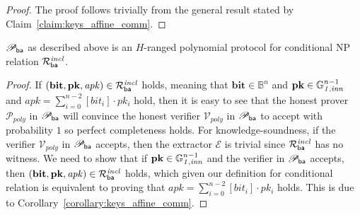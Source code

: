 \begin{proof}The proof follows trivially from the general result stated by Claim~\ref{claim:keys_affine_comm}. 
\end{proof}
\vspace{-0.1in}

\begin{lemma} 
\label{le:ba}
$\mathscr{P}_{\mathsf{ba}}$ as described above is an $H$-ranged polynomial 
protocol for conditional NP relation $\mathcal{R}^{\mathit{incl}}_{\mathsf{ba}}$.
\end{lemma}
\vspace{-0.15in}

\begin{proof}
If $(\mathbf{bit},\mathbf{pk}, \mathit{apk}) \in \mathcal{R}^{\mathit{incl}}_{\mathsf{ba}}$ holds, 
meaning that $\mathbf{bit} \in \mathbb{B}^n$ and $\mathbf{pk} \in \mathbb{G}_{\mathit{1,inn}}^{n-1}$ and $\mathit{apk} = \sum_{i=0}^{n-2} [\mathit{bit_i}] \cdot \mathit{pk_i}$ hold, 
then it is easy to see that the honest prover $\mathcal{P}_{poly}$ in $\mathscr{P}_{\mathsf{ba}}$ will convince the honest verifier $\mathcal{V}_{poly}$ in 
$\mathscr{P}_{\mathsf{ba}}$ to accept with probability $1$ so perfect completeness holds. 
For knowledge-soundness, if the verifier $\mathcal{V}_{poly}$ in $\mathscr{P}_{\mathsf{ba}}$ accepts, 
then the extractor $\mathcal{E}$ is trivial since $\mathcal{R}^{\mathit{incl}}_{\mathsf{ba}}$ has no witness.  
We need to show that if $\mathbf{pk} \in \mathbb{G}_{\mathit{1,inn}}^{n-1}$ and the verifier in $\mathscr{P}_{\mathsf{ba}}$ accepts, 
then $(\mathbf{bit},\mathbf{pk}, \mathit{apk}) \in \mathcal{R}^{\mathit{incl}}_{\mathsf{ba}}$ holds, which given our definition for conditional relation is 
equivalent to proving that $\mathit{apk} = \sum_{i=0}^{n-2} [\mathit{bit_i}] \cdot \mathit{pk_i}$ holds. This is due to 
Corollary~\ref{corollary:keys_affine_comm}. \end{proof}
\vspace{-0.15in}

